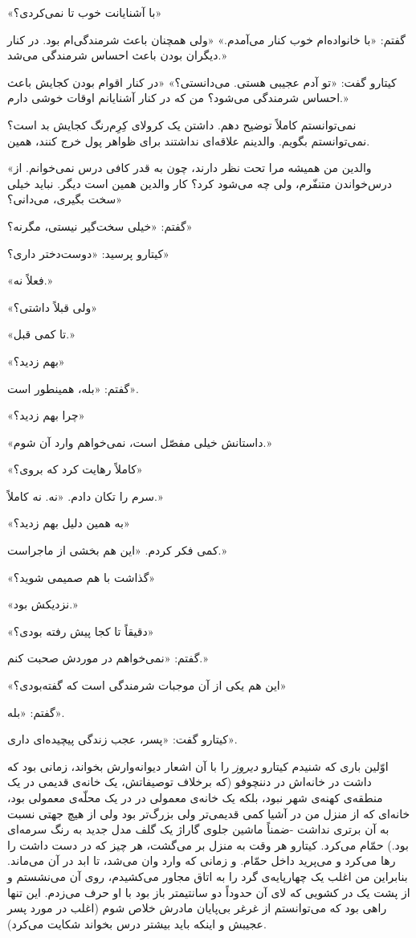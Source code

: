 \documentclass[a5paper]{book}
\begin{document}
«با آشنایانت خوب تا نمی‌کردی؟»

گفتم: «با خانواده‌ام خوب کنار می‌آمدم.» «ولی همچنان باعث شرمندگی‌ام بود. در کنار دیگران بودن باعث احساس شرمندگی می‌شد.»

کیتارو گفت: «تو آدم عجیبی هستی. می‌دانستی؟» «در کنار اقوام بودن کجایش باعث احساس شرمندگی می‌شود؟ من که در کنار آشنایانم اوقات خوشی دارم.»

نمی‌توانستم کاملاً توضیح دهم. داشتن یک کرولای کِرِم‌رنگ کجایش بد است؟ نمی‌توانستم بگویم. والدینم علاقه‌ای نداشتند برای ظواهر پول خرج کنند، همین.

«والدین من همیشه مرا تحت نظر دارند، چون به قدر کافی درس نمی‌خوانم. از درس‌خواندن متنفّرم، ولی چه می‌شود کرد؟ کار والدین همین است دیگر. نباید خیلی سخت بگیری، می‌دانی؟»

گفتم: «خیلی سخت‌گیر نیستی، مگرنه؟»

کیتارو پرسید: «دوست‌دختر داری؟»

«فعلاً نه.»

«ولی قبلاً داشتی؟»

«تا کمی قبل.»

«بهم زدید؟»

گفتم: «بله، همینطور است».

«چرا بهم زدید؟»

«داستانش خیلی مفصّل است، نمی‌خواهم وارد آن شوم.»

«کاملاً رهایت کرد که بروی؟»

سرم را تکان دادم. «نه. نه کاملاً.»

«به همین دلیل بهم زدید؟»

کمی فکر کردم. «این هم بخشی از ماجراست.»

«گذاشت با هم صمیمی شوید؟»

«نزدیکش بود.»

«دقیقاً تا کجا پیش رفته بودی؟»

گفتم: «نمی‌خواهم در موردش صحبت کنم.»

«این هم یکی از آن موجبات شرمندگی است که گفته‌بودی؟»

گفتم: «بله».

کیتارو گفت: «پسر، عجب زندگی پیچیده‌ای داری».

اوّلین باری که شنیدم کیتارو \emph{دیروز} را با آن اشعار دیوانه‌وارش بخواند، زمانی بود که داشت در خانه‌اش در دننچوفو (که برخلاف توصیفاتش، یک خانه‌ی قدیمی در یک منطقه‌ی کهنه‌ی شهر نبود، بلکه یک خانه‌ی معمولی در در یک محلّه‌ی معمولی بود، خانه‌ای که از منزل من در آشیا کمی قدیمی‌تر ولی بزرگ‌تر بود ولی از هیچ جهتی نسبت به آن برتری نداشت -ضمناً ماشین جلوی گاراژ یک گلف مدل جدید به رنگ سرمه‌ای بود.) حمّام می‌کرد. کیتارو هر وقت به منزل بر می‌گشت، هر چیز که در دست داشت را رها می‌کرد و می‌پرید داخل حمّام. و زمانی که وارد وان می‌شد، تا ابد در آن می‌ماند. بنابراین من اغلب یک چهارپایه‌ی گرد را به اتاق مجاور می‌کشیدم، روی آن می‌نشستم و از پشت یک در کشویی که لای آن حدوداً دو سانتیمتر باز بود با او حرف می‌زدم. این تنها راهی بود که می‌توانستم از غرغر بی‌پایان مادرش خلاص شوم (اغلب در مورد پسر عجیبش و اینکه باید بیشتر درس بخواند شکایت می‌کرد).
\end{document}
